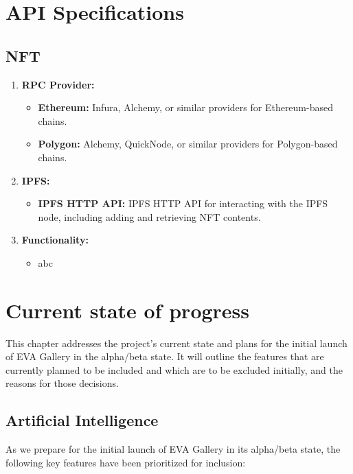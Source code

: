 \chapter{API Specifications}
\section{NFT}
\begin{enumerate}
    \item \textbf{RPC Provider:}
    \begin{itemize}
        \item \textbf{Ethereum:} Infura, Alchemy, or similar providers for Ethereum-based chains.
        \item \textbf{Polygon:} Alchemy, QuickNode, or similar providers for Polygon-based chains.
    \end{itemize}

    \item \textbf{IPFS:}
    \begin{itemize}
        \item \textbf{IPFS HTTP API:} IPFS HTTP API for interacting with the IPFS node, including adding and retrieving NFT contents.
    \end{itemize}


    \item \textbf{Functionality:}
    \begin{itemize}
        \item abc
    \end{itemize}
\end{enumerate}
\newpage

\chapter{Current state of progress}
This chapter addresses the project's current state and plans for the initial launch of EVA Gallery in the alpha/beta state. It will outline the features that are currently planned to be included and which are to be excluded initially, and the reasons for those decisions.

\section{Artificial Intelligence}

As we prepare for the initial launch of EVA Gallery in its alpha/beta state, the following key features have been prioritized for inclusion:

